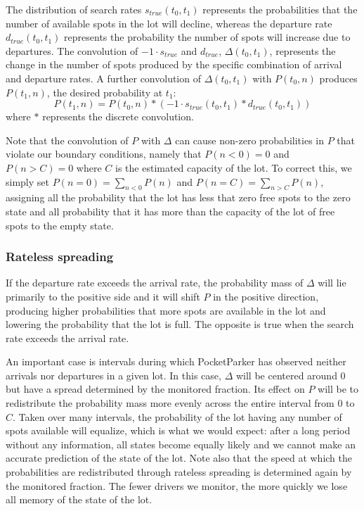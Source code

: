 The distribution of search rates $s_{true}(t_0, t_1)$ represents the
probabilities that the number of available spots in the lot will decline,
whereas the departure rate $d_{true}(t_0, t_1)$ represents the probability
the number of spots will increase due to departures. The convolution of $-1
\cdot s_{true}$ and $d_{true}$, $\Delta(t_0, t_1)$, represents the change in
the number of spots produced by the specific combination of arrival and
departure rates. A further convolution of $\Delta(t_0, t_1)$ with $P(t_0,
n)$ produces $P(t_1, n)$, the desired probability at $t_1$:
%
\[ P(t_1, n) = P(t_0, n) * (-1 \cdot s_{true}(t_0, t_1) * d_{true}(t_0,
t_1)) \]
%
where $*$ represents the discrete convolution.

Note that the convolution of $P$ with $\Delta$ can cause non-zero
probabilities in $P$ that violate our boundary conditions, namely that
$P(n < 0) = 0$ and $P(n > C) = 0$ where $C$ is the estimated capacity of
the lot. To correct this, we simply set $P(n = 0) = \sum_{n < 0} P(n)$
and $P(n = C) = \sum_{n > C} P(n)$, assigning all the probability that
the lot has less that zero free spots to the zero state and all probability
that it has more than the capacity of the lot of free spots to the empty
state.

\subsubsection{Rateless spreading}

If the departure rate exceeds the arrival rate, the probability mass of
$\Delta$ will lie primarily to the positive side and it will shift $P$ in the
positive direction, producing higher probabilities that more spots are
available in the lot and lowering the probability that the lot is full. The
opposite is true when the search rate exceeds the arrival rate.

An important case is intervals during which PocketParker has observed neither
arrivals nor departures in a given lot. In this case, $\Delta$ will be
centered around $0$ but have a spread determined by the monitored fraction.
Its effect on $P$ will be to redistribute the probability mass more evenly
across the entire interval from $0$ to $C$. Taken over many intervals, the
probability of the lot having any number of spots available will equalize,
which is what we would expect: after a long period without any information,
all states become equally likely and we cannot make an accurate prediction of
the state of the lot. Note also that the speed at which the probabilities are
redistributed through rateless spreading is determined again by the monitored
fraction. The fewer drivers we monitor, the more quickly we lose all memory
of the state of the lot.

